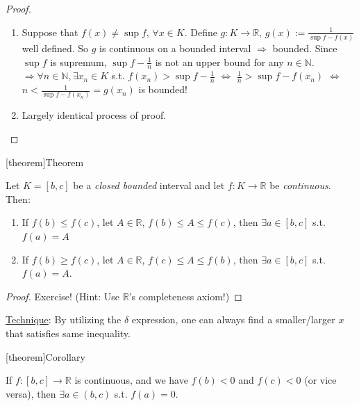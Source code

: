 \documentclass[12pt]{report}
\theoremstyle{definition}
\begin{document}
\begin{proof}
   \begin{enumerate}[label = (\arabic*)]
       \item Suppose that $f(x) \neq \sup{f}$, $\forall x \in K$.
           Define $g:K\rightarrow{}\mathbb{R}$, $g(x) := \frac{1}{\sup{f} - f(x)}$ well defined.
           So $g$ is continuous on a bounded interval $\Rightarrow{}$ bounded.
           Since $\sup{f}$ is supremum, $\sup{f} - \frac{1}{n}$ 
           is not an upper bound for any $n \in \mathbb{N}$.
           $\Rightarrow{} \forall n \in \mathbb{N}, \exists x_n \in K$ s.t. 
           $f(x_n) > \sup{f} - \frac{1}{n}$ $\iff$
           $\frac{1}{n}>\sup{f} - f(x_n)$ $\iff$
           $n < \frac{1}{\sup{f} - f(x_n)} = g(x_n)$ is bounded!

       \item Largely identical process of proof.
   \end{enumerate}
   
\end{proof}

[theorem]{Theorem}
\begin{intermediate value theorem}
    Let $K = [b,c]$ be a \emph{closed bounded} interval and let $f:K\rightarrow{}\mathbb{R}$
    be \emph{continuous}. Then:
    \begin{enumerate}
        \item If $f(b)\le f(c)$, let $A \in \mathbb{R}$, $f(b) \le A \le f(c)$,
            then $\exists a \in [b,c]$ s.t. $f(a) = A$
        \item If $f(b)\ge f(c)$, let $A \in \mathbb{R}$, $f(c) \le A \le f(b)$,
            then $\exists a \in [b,c]$ s.t. $f(a) = A$.
    \end{enumerate}
\end{intermediate value theorem}

\begin{proof}
    Exercise! (Hint: Use $\mathbb{R}$'s completeness axiom!)
\end{proof}

\underline{Technique}: By utilizing the $\delta$ expression,
one can always find a smaller/larger $x$ that satisfies same inequality.

[theorem]{Corollary}
\begin{coro of IVT}
    If $f:[b,c]\rightarrow{}\mathbb{R}$ is continuous,
    and we have $f(b) < 0$ and $f(c) < 0$ (or vice versa),
    then $\exists a \in (b,c)$ s.t. $f(a) = 0$.
\end{coro of IVT}
\end{document}
